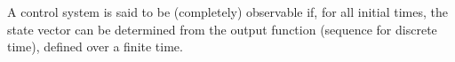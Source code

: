 \documentclass[12pt]{article}
\begin{document}
A control system is said to be (completely) observable if, for all initial times, the state vector can be determined from the output function (sequence for discrete time), defined over a finite time.
\end{document}
